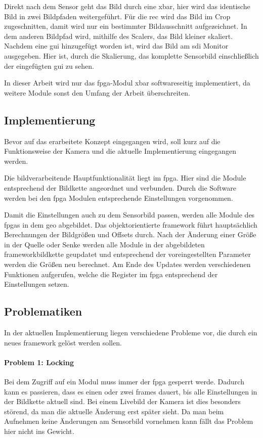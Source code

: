 Direkt nach dem Sensor geht das Bild durch eine \ac{xbar}, hier wird das identische Bild in zwei Bildpfaden weitergeführt. Für die \acl{rec} wird das Bild im Crop zugeschnitten, damit wird nur ein bestimmter Bildausschnitt aufgezeichnet. In dem anderen Bildpfad wird, mithilfe des Scalers, das Bild kleiner skaliert. Nachdem eine \ac{gui} hinzugefügt worden ist, wird das Bild am \ac{sdi} Monitor ausgegeben. Hier ist, durch die Skalierung, das komplette Sensorbild einschließlich der eingefügten \ac{gui} zu sehen.

In dieser Arbeit wird nur das \ac{fpga}-Modul \ac{xbar} softwareseitig implementiert, da weitere Module sonst den Umfang der Arbeit überschreiten.

\subsection{Implementierung}
Bevor auf das erarbeitete Konzept eingegangen wird, soll kurz auf die Funktionsweise der Kamera und die aktuelle Implementierung eingegangen werden.

Die bildverarbeitende Hauptfunktionalität liegt im \ac{fpga}. Hier sind die Module entsprechend der Bildkette angeordnet und verbunden. Durch die Software werden bei den \ac{fpga} Modulen entsprechende Einstellungen vorgenommen.

Damit die Einstellungen auch zu dem Sensorbild passen, werden alle Module des \ac{fpga}s in dem \ac{geo} abgebildet. Das objektorientierte \gls{framework} führt hauptsächlich Berechnungen der Bildgrößen und Offsets durch. Nach der Änderung einer Größe in der Quelle oder Senke werden alle Module in der abgebildeten \gls{framework}bildkette geupdatet und entsprechend der voreingestellten Parameter werden die Größen neu berechnet. Am Ende des Updates werden verschiedenen Funktionen aufgerufen, welche die Register im \ac{fpga} entsprechend der Einstellungen setzen.


\subsection{Problematiken}\label{sec:prob}
In der aktuellen Implementierung liegen verschiedene Probleme vor, die durch ein neues \gls{framework} gelöst werden sollen.

\paragraph*{Problem 1: Locking} Bei dem Zugriff auf ein Modul muss immer der \ac{fpga} gesperrt werde. Dadurch kann es passieren, dass es einen oder zwei \glspl{frame} dauert, bis alle Einstellungen in der Bildkette aktuell sind. Bei einem Livebild der Kamera ist dies besonders störend, da man die aktuelle Änderung erst später sieht. Da man beim Aufnehmen keine Änderungen am Sensorbild vornehmen kann fällt das Problem hier nicht ins Gewicht.

